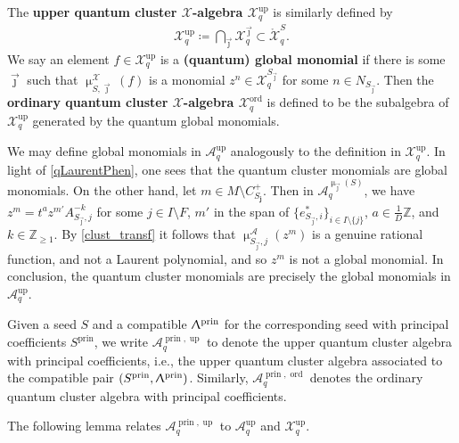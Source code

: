 \documentclass{amsart}
\DeclareMathOperator{\prin}{prin}
\DeclareMathOperator{\up}{up}
\DeclareMathOperator{\ord}{ord}
\let\bb=\mathbb
\let\s=\mathcal
\let\mr=\mathring
\newcommand {\jj} {\vec{\jmath}}
\renewcommand{\Lambda}{\Uplambda}
\renewcommand{\mu}{\upmu}
\theoremstyle{plain}%
\theoremstyle{definition}
\theoremstyle{remark}
\begin{document}
The \textbf{upper quantum cluster $\s{X}$-algebra $\s{X}^{\up}_q$} is similarly defined by
\begin{align*}
    \s{X}^{\up}_q \coloneqq  \bigcap_{\jj} \s{X}^{\jj}_q \subset  \mr{\s{X}}_q^S.
\end{align*}
We say an element $f\in \s{X}^{\up}_q$ is a \textbf{(quantum) global monomial} if there is some $\jj$ such that $\mu_{{S},\jj}^{\s{X}}(f)$ is a monomial $z^{n}\in \s{X}_q^{S_{\jj}}$ for some $n\in N_{S_{\jj}}$.   Then the \textbf{ordinary quantum cluster $\s{X}$-algebra $\s{X}^{\ord}_q$} is defined to be the subalgebra of $\s{X}_q^{\up}$ generated by the quantum global monomials.  



We may define global monomials in $\s{A}_q^{\up}$ analogously to the definition in $\s{X}_q^{\up}$.  In light of \eqref{qLaurentPhen}, one sees that the quantum cluster monomials are global monomials.  On the other hand, let $m\in M\setminus C^+_{S_{\mathbf{j}}}$.  Then in $\s{A}_q^{\mu_{\jj}(S)}$, we have $z^m=t^{a}z^{m'}A_{S_{\jj},j}^{-k}$ for some $j\in I\setminus F$, $m'$ in the span of $\{e_{S_{\jj},i}^*\}_{i\in I\setminus \{j\}}$,  $a\in\frac{1}{D}\mathbb{Z}$, and $k\in \bb{Z}_{\geq 1}$.  By \eqref{clust_transf} it follows that $\mu^{\mathcal{A}}_{S_{\jj},j}(z^m)$ is a genuine rational function, and not a Laurent polynomial, and so $z^m$ is not a global monomial.  In conclusion, the quantum cluster monomials are precisely the global monomials in $\s{A}_q^{\up}$.


Given a seed $S$ and a compatible $\Lambda^{\prin}$ for the corresponding seed with principal coefficients $S^{\prin}$, we write $\s{A}_q^{\prin,\up}$ to denote the upper quantum cluster algebra with principal coefficients, i.e., the upper quantum cluster algebra associated to the compatible pair $(S^{\prin},\Lambda^{\prin})$.  Similarly, $\s{A}_q^{\prin,\ord}$ denotes the ordinary quantum cluster algebra with principal coefficients.  


The following lemma relates $\s{A}_q^{\prin,\up}$ to $\s{A}_q^{\up}$ and $\s{X}^{\up}_q$.  
\end{document}
